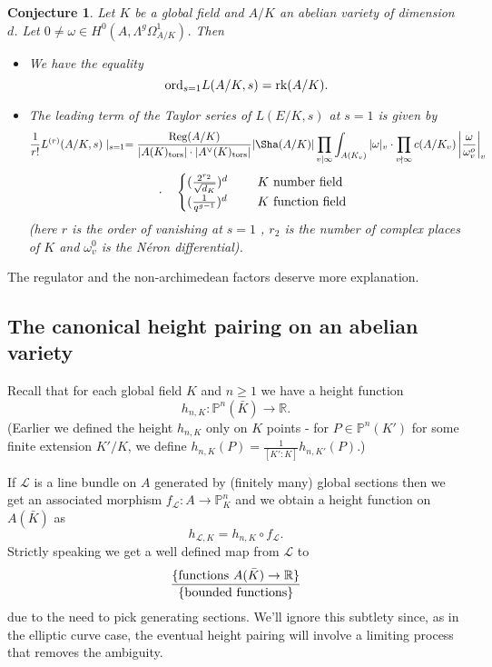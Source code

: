 \documentclass[12pt]{amsart}
\numberwithin{equation}{section}
\newtheorem{conjecture}{Conjecture}
\theoremstyle{remark}
\theoremstyle{definition}
\theoremstyle{definition}
\theoremstyle{definition}
\theoremstyle{definition}
\theoremstyle{definition}
\theoremstyle{definition}
\theoremstyle{definition}
\begin{document}
\begin{conjecture}
Let $K$ be a global field and $A/K$ an abelian variety of dimension $d$. Let $0\neq \omega \in H^0(A,\Lambda^g\Omega^1_{A/K})$. Then
\begin{itemize}
\item[(i)] We have the equality
\[\textup{ord}_{s=1}L(A/K,s)=\textup{rk}(A/K).\]
\item[(ii)] The leading term of the Taylor series of $L(E/K,s)$ at $s=1$ is given by
 \[\frac{1}{r!}L^{(r)}(A/K,s)\mid_{s=1}=\frac{\textup{Reg}(A/K)}{|A(K)_\textup{tors}|\cdot |A^{\vee}(K)_\textup{tors}|}|\Sha(A/K)|\prod_{v\mid \infty}\int_{A(K_v)}|\omega|_v\cdot \prod_{v \nmid \infty}c(A/K_v) \left|\frac{\omega}{\omega_{v}^o}\right|_v\]
 \[~~~\cdot ~~~\begin{cases}(\frac{2^{r_2}}{\sqrt{d_K}})^d~~&~~K~\textup{number field}\\ (\frac{1}{q^{g-1}})^d~~&~~K\textup{ function field}\end{cases}\]
 (here $r$ is the order of vanishing at $s=1$ , $r_2$ is the number of complex places of $K$ and $\omega^0_v$ is the \emph{N\'{e}ron differential}).
\end{itemize}
\end{conjecture}

The regulator and the non-archimedean factors deserve more explanation. 

\subsection{The canonical height pairing on an abelian variety}

Recall that for each global field $K$ and $n\geq 1$ we have a height function
\[h_{n,K}:\mathbb{P}^n(\bar{K})\rightarrow \mathbb{R}.\]
(Earlier we defined the height $h_{n,K}$ only on $K$ points - for $P\in \mathbb{P}^n(K')$ for some finite extension $K'/K$, we define $h_{n,K}(P)=\frac{1}{[K':K]}h_{n,K'}(P)$.)

If $\mathcal{L}$ is a  line bundle on $A$ generated by (finitely many) global sections then we get an associated morphism $f_\mathcal{L}:A\rightarrow \mathbb{P}^n_K$ and we obtain a height function on $A(\bar{K})$ as
\[h_{\mathcal{L},K}=h_{n,K}\circ f_\mathcal{L}.\]
Strictly speaking we get a well defined map from $\mathcal{L}$ to 
\[\frac{\{\textup{functions }A(\bar{K})\rightarrow \mathbb{R}\}}{\{\textup{bounded functions}\}}\]
due to the need to pick generating sections. We'll ignore this subtlety since, as in the elliptic curve case, the eventual height pairing will involve a limiting process that removes the ambiguity. 
\end{document}
